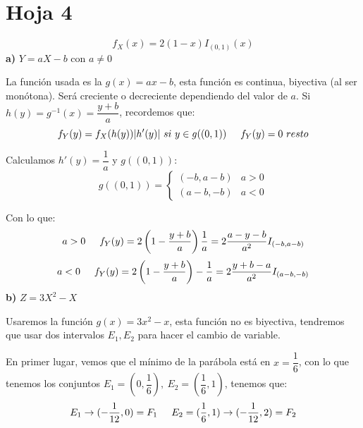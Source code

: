 \documentclass[openany]{book}
\begin{document}
\chapter{Hoja 4}

\begin{exercise}
    $$ f_{X} (x) = 2(1-x) I_{(0,1)}(x) $$
    \textbf{a)} $ Y = aX-b $ con $ a \ne 0 $

    La función usada es la $ g(x) = ax-b $, esta función es continua, biyectiva (al ser monótona). Será creciente o decreciente dependiendo del valor de $ a $. Si $ h(y) = g ^{-1}(x) = \dfrac{y+b}{a} $, recordemos que:
    $$ f_{Y}(y) = f_{X}(h(y)) |h'(y)|\ si\ y \in g((0,1))\hspace{5mm}f_{Y}(y) = 0\ resto $$

    Calculamos $ h'(y) = \dfrac{1}{a} $ y $ g((0,1)) $:
    $$ g((0,1)) = \left\{
    \begin{array}{ll}
        (-b,a-b) & a>0\\
        (a-b,-b) & a<0
    \end{array}
    \right. $$
    
    Con lo que:
    $$ a > 0\hspace{5mm}f_{Y}(y) = 2\left(1-\dfrac{y+b}{a}\right)\dfrac{1}{a} = 2 \dfrac{a-y-b}{a^2}I_{(-b,a-b)} $$
    $$ a < 0\hspace{5mm}f_{Y}(y) = 2\left(1-\dfrac{y+b}{a}\right)-\dfrac{1}{a} = 2 \dfrac{y+b-a}{a^2}I_{(a-b,-b)} $$
    \textbf{b)} $ Z = 3X^2-X $

    Usaremos la función $ g(x) = 3x^2-x $, esta función no es biyectiva, tendremos que usar dos intervalos $ E_1,E_2 $ para hacer el cambio de variable.


    En primer lugar, vemos que el mínimo de la parábola está en $ x = \dfrac{1}{6} $, con lo que tenemos los conjuntos $ E_1 = (0,\dfrac{1}{6}),\ E_2 = (\dfrac{1}{6},1) $, tenemos que:
    $$ E_1 \to (-\dfrac{1}{12},0) = F_1 \hspace{5mm}E_2 = (\dfrac{1}{6},1) \to (-\dfrac{1}{12},2) = F_2 $$
\end{exercise}
\end{document}
